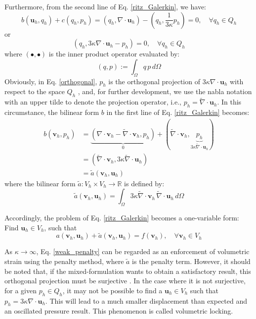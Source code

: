 Furthermore, from the second line of Eq. \eqref{ritz_Galerkin}, we have:
\begin{equation}\label{forms_bc}
b(\boldsymbol{u}_h, q_h) + c(q_h, p_h) = (q_h, \nabla \cdot \boldsymbol{u}_h) - (q_h, \frac{1}{3\kappa} p_h) = 0, \quad \forall q_h \in Q_h
\end{equation}
or
\begin{equation}\label{orthogonal}
(q_h, 3\kappa \nabla \cdot \boldsymbol{u}_h - p_h) = 0, \quad \forall q_h \in Q_h
\end{equation}
where $(\bullet, \bullet)$ is the inner product operator evaluated by:
\begin{equation}
(q, p) := \int_\Omega q \, p \, d\Omega
\end{equation}
Obviously, in Eq. \eqref{orthogonal}, $p_h$ is the orthogonal projection of $3\kappa \nabla \cdot \boldsymbol{u}_h$ with respect to the space $Q_h$ \cite{brezzi1991}, and, for further development, we use the nabla notation with an upper tilde to denote the projection operator, i.e., $p_h = \tilde{\nabla} \cdot \boldsymbol{u}_h$. In this circumstance, the bilinear form $b$ in the first line of Eq. \eqref{ritz_Galerkin} becomes:
\begin{equation}
\begin{split}
b(\boldsymbol{v}_h, p_h) &= \underbrace{(\nabla \cdot \boldsymbol{v}_h - \tilde{\nabla} \cdot \boldsymbol{v}_h, p_h)}_{0} + (\tilde{\nabla} \cdot \boldsymbol{v}_h, \underbrace{p_h}_{3\kappa \tilde \nabla \cdot \boldsymbol u_h}) \\
&= (\tilde{\nabla} \cdot \boldsymbol{v}_h, 3\kappa \tilde{\nabla} \cdot \boldsymbol{u}_h) \\
&= \tilde{a}(\boldsymbol{v}_h, \boldsymbol{u}_h)
\end{split}
\end{equation}
where the bilinear form $\tilde{a}: V_h \times V_h \rightarrow \mathbb{R}$ is defined by:
\begin{equation}
\tilde{a}(\boldsymbol{v}_h, \boldsymbol{u}_h) = \int_\Omega 3\kappa \tilde{\nabla} \cdot \boldsymbol{v}_h \, \tilde{\nabla} \cdot \boldsymbol{u}_h \, d\Omega
\end{equation}

Accordingly, the problem of Eq. \eqref{ritz_Galerkin} becomes a one-variable form:
Find $\boldsymbol{u}_h \in V_h$, such that
\begin{equation}\label{weak_penalty}
a(\boldsymbol{v}_h, \boldsymbol{u}_h) + \tilde{a}(\boldsymbol{v}_h, \boldsymbol{u}_h) = f(\boldsymbol{v}_h), \quad \forall \boldsymbol{v}_h \in V_h
\end{equation}

As $\kappa \rightarrow \infty$, Eq. \eqref{weak_penalty} can be regarded as an enforcement of volumetric strain using the penalty method, where $\tilde{a}$ is the penalty term. However, it should be noted that, if the mixed-formulation wants to obtain a satisfactory result, this orthogonal projection must be surjective \cite{stein2004}. In the case where it is not surjective, for a given $p_h \in Q_h$, it may not be possible to find a $\boldsymbol{u}_h \in V_h$ such that $p_h = 3\kappa \nabla \cdot \boldsymbol{u}_h$. This will lead to a much smaller displacement than expected and an oscillated pressure result. This phenomenon is called volumetric locking.